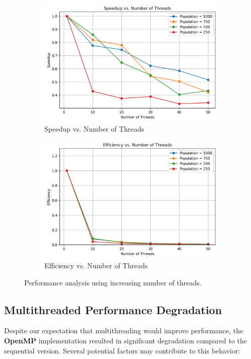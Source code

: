 \begin{figure}[h]
    \centering
    \begin{subfigure}{0.45\textwidth}
        \centering
        \includegraphics[width=\linewidth]{figures/speedup_vs_threads.png}
        \caption{Speedup vs. Number of Threads}
    \end{subfigure}
    \hfill
    \begin{subfigure}{0.45\textwidth}
        \centering
        \includegraphics[width=\linewidth]{figures/efficiency_vs_threads.png}
        \caption{Efficiency vs. Number of Threads}
    \end{subfigure}
    \caption{Performance analysis using increasing number of threads.}
    \label{fig:nodes_performance}
\end{figure}
\newline
\subsection{Multithreaded Performance Degradation}
Despite our expectation that multithreading would improve performance, the \textbf{OpenMP} implementation resulted in significant degradation compared to the sequential version. Several potential factors may contribute to this behavior:

